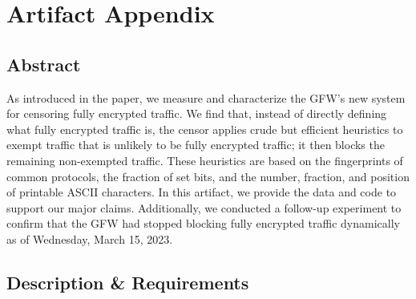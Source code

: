 %

\appendix
\section{Artifact Appendix}


\subsection{Abstract}

As introduced in the paper, we measure and characterize the GFW's new
system for censoring fully encrypted traffic. We find that, 
instead of directly defining what fully encrypted traffic is, the
censor applies crude but efficient heuristics to exempt traffic
that is unlikely to be fully encrypted traffic; it then blocks the
remaining non-exempted traffic. These heuristics are based
on the fingerprints of common protocols, the fraction of set
bits, and the number, fraction, and position of printable ASCII
characters. 
In this artifact,
we provide the data and code to support our major claims.
Additionally, we conducted a follow-up experiment to confirm that
the GFW had stopped blocking fully encrypted traffic dynamically
as of Wednesday, March 15, 2023.

\subsection{Description \& Requirements}

